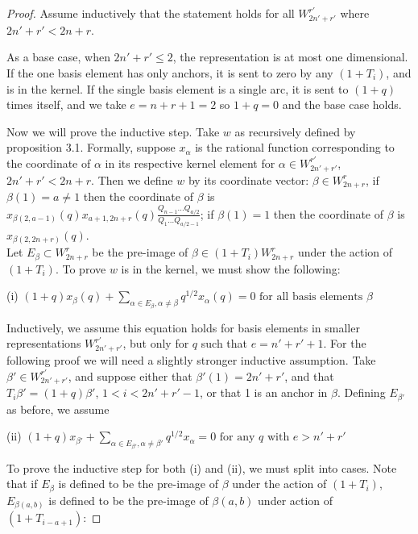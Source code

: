 \documentclass{amsart}
\begin{document}
\begin{proof}
	
	Assume inductively that the statement holds for all $W_{2n'+r'}^{r'}$ where $2n'+r'<2n+r$.
	
	As a base case, when $2n'+r'\leq 2$, the representation is at most one dimensional. If the one basis element has only anchors, it is sent to zero by any $(1+T_i)$, and is in the kernel. If the single basis element is a single arc, it is sent to $(1+q)$ times itself, and we take $e=n+r+1=2$ so $1+q=0$ and the base case holds.
	
	\vspace{5mm}
	Now we will prove the inductive step. Take $w$ as recursively defined by proposition 3.1. Formally, suppose $x_\alpha$ is the rational function corresponding to the coordinate of $\alpha$ in its respective kernel element for $\alpha\in W_{2n'+r'}^{r'}$, $2n'+r'<2n+r$. Then we define $w$ by its coordinate vector: $\beta\in W_{2n+r}^r$, if $\beta(1)=a\not=1$ then the coordinate of $\beta$ is $x_{\beta(2,a-1)}(q)x_{a+1,2n+r}(q)\frac{Q_{n-1}...Q_{a/2}}{Q_1...Q_{a/2-1}}$; if $\beta(1)=1$ then the coordinate of $\beta$ is $x_{\beta(2,2n+r)}(q)$. 
	\\
	
	Let $E_\beta\subset W_{2n+r}^r$ be the pre-image of $\beta\in (1+T_i)W_{2n+r}^r$ under the action of $(1+T_i)$. To prove $w$ is in the kernel, we must show the following: 
	\begin{center}
	(i) $(1+q)x_\beta(q)+\sum_{\alpha\in E_\beta,\alpha\not=\beta}q^{1/2}x_\alpha(q)=0\text{ for all basis elements }\beta$
	\end{center}
	Inductively, we assume this equation holds for basis elements in smaller representations $W_{2n'+r'}^{r'}$, but only for $q$ such that $e=n'+r'+1$. For the following proof we will need a slightly stronger inductive assumption. Take $\beta'\in W_{2n'+r'}^{r'}$, and suppose either that $\beta'(1)=2n'+r'$, and that $T_i\beta'=(1+q)\beta'$, $1<i<2n'+r'-1$, or that 1 is an anchor in $\beta$. Defining $E_{\beta'}$ as before, we assume
	
	\begin{center}
		(ii) $(1+q)x_{\beta'}+\sum_{\alpha\in E_{\beta'},\alpha\not=\beta'}q^{1/2}x_\alpha=0\text{ for any } q \text{ with }e>n'+r'$
	\end{center}
	
	\vspace{5mm}
	To prove the inductive step for both (i) and (ii), we must split into cases. Note that if $E_\beta$ is defined to be the pre-image of $\beta$ under the action of $(1+T_i)$, $E_{\beta(a,b)}$ is defined to be the pre-image of $\beta(a,b)$ under action of $(1+T_{i-a+1})$:
	

\end{proof}
\end{document}
